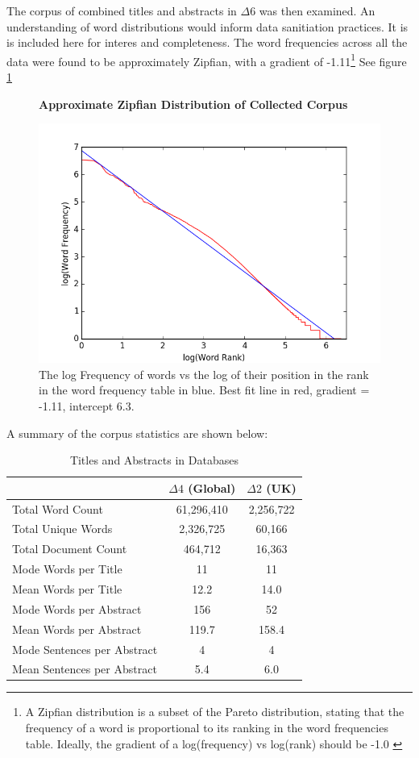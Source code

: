 The corpus of combined titles and abstracts in $\Delta6$ was then examined. An understanding of word distributions would inform data sanitiation practices. It is is included here for interes and completeness. The word frequencies across all the data were found to be approximately Zipfian, with a gradient of -1.11\footnote{A Zipfian distribution is a subset of the Pareto distribution, stating that the frequency of a word is proportional to its ranking in the word frequencies table. Ideally, the gradient of a log(frequency) vs log(rank) should be -1.0 \cite{zipf}} See figure \ref{fig:ZIPF}
\begin{figure}[H]
    \centering
    \textbf{Approximate Zipfian Distribution of Collected Corpus}\par\medskip
    \includegraphics[scale=0.6]{Data_Acquisition/zipf.png}
    \caption[Zipfian Plot of Collected Corpus]{The log Frequency of words vs the log of their position in the rank in the word frequency table in blue. Best fit line in red, gradient = -1.11, intercept 6.3. }
     \label{fig:ZIPF}
\end{figure}
A summary of the corpus statistics are shown below:
\begin{table}[h!]
\caption{Titles and Abstracts in Databases}
\label{tab:CORPUS STATS}
\begin{center}
\begin{tabular}{||l|c|c||}
\hline
&$\Delta4$ (Global)& $\Delta2$ (UK)\\
\hline
Total Word Count & 61,296,410 & 2,256,722 \\
Total Unique Words & 2,326,725 & 60,166\\
Total Document Count & 464,712 & 16,363\\
Mode Words per Title &  11 & 11\\
Mean Words per Title &  12.2 & 14.0\\
Mode Words per Abstract & 156 & 52\\
Mean Words per Abstract & 119.7 & 158.4\\
Mode Sentences per Abstract & 4 & 4\\
Mean Sentences per Abstract & 5.4 & 6.0\\
\hline
\end{tabular}
\end{center}
\end{table}
